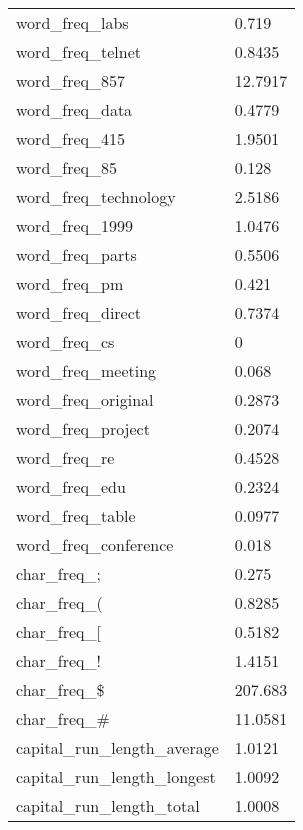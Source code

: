 \begin{tabular}{|l|l|}
word\_freq\_labs                 &  0.719 \\
word\_freq\_telnet               & 0.8435 \\
word\_freq\_857                  &12.7917 \\
word\_freq\_data                 & 0.4779 \\
word\_freq\_415                  & 1.9501 \\
word\_freq\_85                   &  0.128 \\
word\_freq\_technology           & 2.5186 \\
word\_freq\_1999                 & 1.0476 \\
word\_freq\_parts                & 0.5506 \\
word\_freq\_pm                   &  0.421 \\
word\_freq\_direct               & 0.7374 \\
word\_freq\_cs                   &      0 \\
word\_freq\_meeting              &  0.068 \\
word\_freq\_original             & 0.2873 \\
word\_freq\_project              & 0.2074 \\
word\_freq\_re                   & 0.4528 \\
word\_freq\_edu                  & 0.2324 \\
word\_freq\_table                & 0.0977 \\
word\_freq\_conference           &  0.018 \\
char\_freq\_;                    &  0.275 \\
char\_freq\_(                    & 0.8285 \\
char\_freq\_[                    & 0.5182 \\
char\_freq\_!                    & 1.4151 \\
char\_freq\_\$                   & 207.683 \\
char\_freq\_\#                   & 11.0581 \\
capital\_run\_length\_average     & 1.0121 \\
capital\_run\_length\_longest     & 1.0092 \\
capital\_run\_length\_total       & 1.0008 \\
\hline
\end{tabular}
